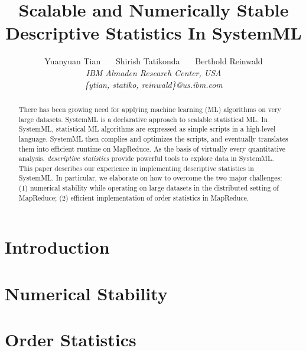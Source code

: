 \documentclass[10pt,conference,letterpaper]{IEEEtran}
\begin{document}
%
\title{Scalable and Numerically Stable Descriptive Statistics In SystemML}
\author{Yuanyuan Tian \ \ \  Shirish Tatikonda \ \ \  Berthold Reinwald
%
\vspace{1.6mm}\\
\fontsize{10}{10}\selectfont\itshape
\fontsize{10}{10}\selectfont\rmfamily\itshape
IBM Almaden Research Center, USA\\
\fontsize{9}{9}\selectfont\ttfamily\upshape
\{ytian, statiko, reinwald\}@us.ibm.com
}%
\maketitle
\begin{abstract}
There has been growing need for applying machine learning (ML) algorithms on very large datasets. SystemML is a declarative approach to scalable statistical ML. In SystemML, statistical ML algorithms are expressed as simple scripts in a high-level language. SystemML then complies and optimizes the scripts, and eventually translates them into efficient runtime on MapReduce. As the basis of virtually every quantitative analysis, \textit{descriptive statistics} provide powerful tools to explore data in SystemML. This paper describes our experience in implementing descriptive statistics in SystemML. In particular, we elaborate on how to overcome the two major challenges: (1) numerical stability while operating on large datasets in the distributed setting of MapReduce; (2) efficient implementation of order statistics in MapReduce.
\end{abstract}

\section{Introduction}


\section{Numerical Stability}


\section{Order Statistics}







\end{document}
